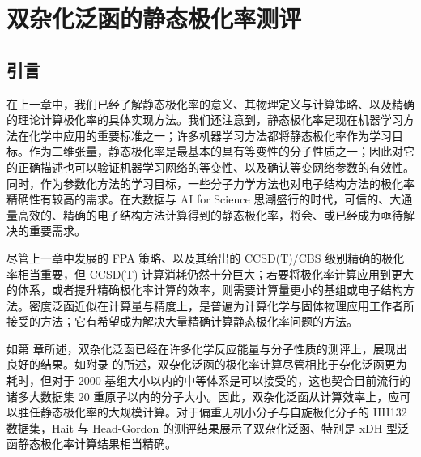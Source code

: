 
\chapter{双杂化泛函的静态极化率测评}
\label{sec.6.title}

\section{引言}

在上一章中，我们已经了解静态极化率的意义、其物理定义与计算策略、以及精确的理论计算极化率的具体实现方法。我们还注意到，静态极化率是现在机器学习方法在化学中应用的重要标准之一；许多机器学习方法都将静态极化率作为学习目标\cite{Ramakrishnan-Lilienfeld.SD.2014, Gilmer-Dahl.ICML.2017, Faber-Lilienfeld.JCTC.2017, Schuett-Mueller.NIPS.2017, Schuett-Mueller.JCP.2018, Wilkins-Ceriotti.PNAS.2019, Schuett-Gastegger.arXiv.2021, Zhang-Jiang.Elsevier.2023, Zou-Hu.NCS.2023}。作为二维张量，静态极化率是最基本的具有等变性的分子性质之一；因此对它的正确描述也可以验证机器学习网络的等变性、以及确认等变网络参数的有效性\cite{Cohen-Welling.arXiv.2016, Schuett-Gastegger.arXiv.2021, Brandstetter-Welling.arXiv.2022, Geiger-Smidt.arXiv.2022}。同时，作为参数化方法的学习目标，一些分子力学方法也对电子结构方法的极化率精确性有较高的需求\cite{Halgren-Damm.COSB.2001, Baker-Baker.WCMS.2015, Goloviznina-Padua.JCTC.2019, Schauperl-Gilson.CC.2020}。在大数据与 AI for Science 思潮盛行的时代，可信的、大通量高效的、精确的电子结构方法计算得到的静态极化率，将会、或已经成为亟待解决的重要需求。

尽管上一章中发展的 FPA 策略、以及其给出的 CCSD(T)/CBS 级别精确的极化率相当重要，但 CCSD(T) 计算消耗仍然十分巨大；若要将极化率计算应用到更大的体系，或者提升精确极化率计算的效率，则需要计算量更小的基组或电子结构方法。密度泛函近似在计算量与精度上，是普遍为计算化学与固体物理应用工作者所接受的方法；它有希望成为解决大量精确计算静态极化率问题的方法。

如第  章所述，双杂化泛函已经在许多化学反应能量与分子性质的测评上，展现出良好的结果。如附录  的所述，双杂化泛函的极化率计算尽管相比于杂化泛函更为耗时，但对于 2000 基组大小以内的中等体系是可以接受的，这也契合目前流行的诸多大数据集 20 重原子以内的分子大小\cite{Ruddigkeit-Reymond.JCIM.2012, Ramakrishnan-Lilienfeld.SD.2014, Bowman-Yu.JCP.2022, Zou-Hu.NCS.2023}。因此，双杂化泛函从计算效率上，应可以胜任静态极化率的大规模计算。对于偏重无机小分子与自旋极化分子的 HH132 数据集，Hait 与 Head-Gordon 的测评结果展示了双杂化泛函、特别是 xDH 型泛函静态极化率计算结果相当精确\cite{Hait-Head-Gordon.PCCP.2018}。

